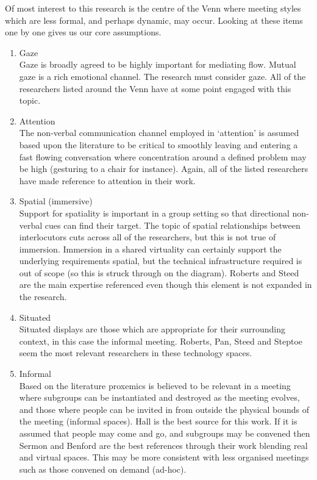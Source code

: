 Of most interest to this research is the centre of the Venn where meeting styles which are less formal, and perhaps dynamic, may occur. Looking at these items one by one gives us our core assumptions.

                \begin{enumerate}
                \item Gaze\\
                 Gaze is broadly agreed to be highly important for mediating flow. Mutual gaze is a rich emotional channel. The research must consider gaze. All of the researchers listed around the Venn have at some point engaged with this topic.
                \item Attention\\
                The non-verbal communication channel employed in `attention' is assumed based upon the literature to be critical to smoothly leaving and entering a fast flowing conversation where concentration around a defined problem may be high (gesturing to a chair for instance). Again, all of the listed researchers have made reference to attention in their work.
                \item Spatial (immersive)\\
Support for spatiality is important in a group setting so that directional non-verbal cues can find their target. The topic of spatial relationships between interlocutors cuts across all of the researchers, but this is not true of immersion. Immersion in a shared virtuality can certainly support the underlying requirements spatial, but the technical infrastructure required is out of scope (so this is struck through on the diagram). Roberts and Steed are the main expertise referenced even though this element is not expanded in the research.
                \item Situated\\
                Situated displays are those which are appropriate for their surrounding context, in this case the informal meeting. Roberts, Pan, Steed and Steptoe seem the most relevant researchers in these technology spaces.
                \item Informal\\
                   Based on the literature proxemics is believed to be relevant in a meeting where subgroups can be instantiated and destroyed as the meeting evolves, and those where people can be invited in from outside the physical bounds of the meeting (informal spaces). Hall is the best source for this work. If it is assumed that people may come and go, and subgroups may be convened then Sermon and Benford are the best references through their work blending real and virtual spaces. This may be more consistent with less organised meetings such as those convened on demand (ad-hoc).
                \end{enumerate}

